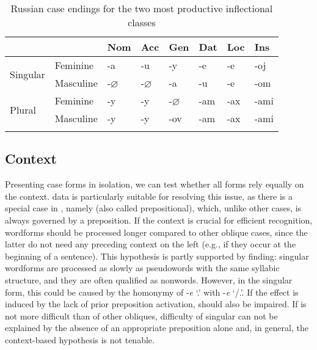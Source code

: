 \documentclass[output=paper, modfonts,newtxmath,hidelinks]{langscibook}
\begin{document}
\begin{table}
    \centering
	\caption{Russian case endings for the two most productive inflectional classes}
    \label{tab:rusDecl}
	\begin{tabular}{*{8}l}
		\lsptoprule
        ~	&	~	&	Nom    &	Acc	 & Gen  &	Dat &	Loc &	Ins	\\
        \midrule
		\multirow{2}{*}{Singular} & Feminine	&	-a  &	-u	&	-y	&	-e	& -e    &	-oj\\
		&	Masculine			&	-$\varnothing$  & -$\varnothing$    &	-a	&	-u	&   -e  &	-om	\\
        \midrule
        \multirow{2}{*}{Plural} & Feminine	& -y    & -y    &	-$\varnothing$ & -am  & -ax & -ami \\
        &	Masculine & -y  & -y &	-ov & -am    & -ax & -ami\\
		\lspbottomrule
    \end{tabular}
\end{table}

\subsection{Context}
Presenting case forms in isolation, we can test whether all  forms  rely equally on the context.  data is particularly suitable for resolving this issue, as there is a special case in , namely  (also called prepositional), which, unlike other cases, is always governed by a preposition. If the context is crucial for efficient  recognition,  wordforms should be processed longer compared to other oblique cases, since the latter do not need any preceding context on the left (e.g., if they occur at the beginning of a sentence). This hypothesis is partly supported by  finding:   singular wordforms are processed as slowly as pseudowords with the same syllabic structure, and they are often qualified as nonwords. However, in the singular form, this  could be caused by the homonymy of -\textit{e} `\locc.\masc' with  -\textit{e} `\datt/\locc.\fem'. If the effect is induced by the lack of prior preposition activation,    should also be impaired. If    is not more difficult than  of other obliques, difficulty of   singular can not be explained by the absence of an appropriate preposition alone and, in general, the context-based hypothesis is not tenable. 
\end{document}
